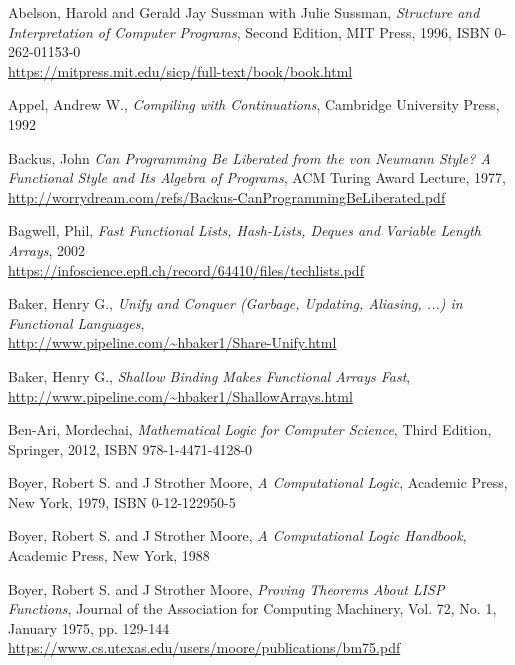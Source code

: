 \begin{thebibliography}{90}

  Abelson, Harold and Gerald Jay Sussman with Julie Sussman,
  \emph{Structure and Interpretation of Computer Programs},
  Second Edition, MIT Press, 1996, ISBN 0-262-01153-0 \\
  \url{https://mitpress.mit.edu/sicp/full-text/book/book.html}

  Appel, Andrew W.,
  \emph{Compiling with Continuations},
  Cambridge University Press, 1992
  
  Backus, John
  \emph{Can Programming Be Liberated from the von Neumann Style?
    A Functional Style and Its Algebra of Programs},
  ACM Turing Award Lecture, 1977, \\
  \url{http://worrydream.com/refs/Backus-CanProgrammingBeLiberated.pdf}
  
  Bagwell, Phil,
  \emph{Fast Functional Lists, Hash-Lists, Deques
    and Variable Length Arrays}, 2002 \\
  \url{https://infoscience.epfl.ch/record/64410/files/techlists.pdf}  

  Baker, Henry G., \emph{Unify and Conquer (Garbage, Updating, Aliasing, ...) in Functional Languages}, \\
  \url{http://www.pipeline.com/~hbaker1/Share-Unify.html}
  
  Baker, Henry G., \emph{Shallow Binding Makes Functional Arrays Fast}, \\
  \url{http://www.pipeline.com/~hbaker1/ShallowArrays.html}
  
  Ben-Ari, Mordechai,
  \emph{Mathematical Logic for Computer Science},
  Third Edition, Springer, 2012,
  ISBN 978-1-4471-4128-0
  
  Boyer, Robert S. and J Strother Moore,
  \emph{A Computational Logic},
  Academic Press, New York, 1979,
  ISBN 0-12-122950-5

  Boyer, Robert S. and J Strother Moore,
  \emph{A Computational Logic Handbook},
  Academic Press, New York, 1988

  Boyer, Robert S. and J Strother Moore,
  \emph{Proving Theorems About LISP Functions},
  Journal of the Association for Computing Machinery, Vol. 72,
  No. 1, January 1975, pp. 129-144 \\
  \url{https://www.cs.utexas.edu/users/moore/publications/bm75.pdf}
  

\end{thebibliography}
